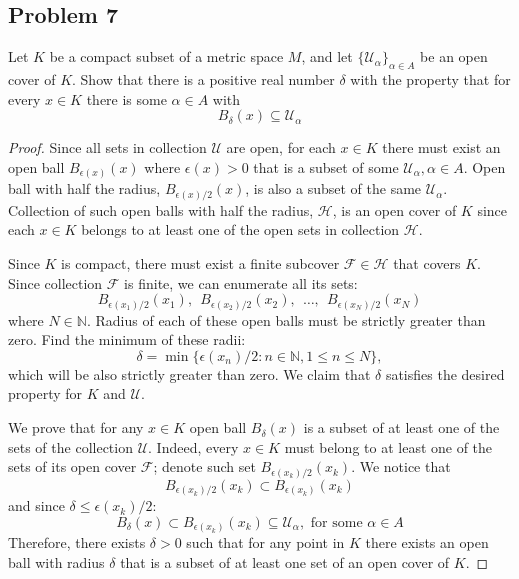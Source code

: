 \documentclass{article}
\begin{document}
\subsection*{Problem 7}

\begin{tcolorbox}
Let $K$ be a compact subset of a metric space $M$, and let $\{ \mathcal{U}_\alpha \}_{\alpha \in A}$ be an open cover of $K$. Show that there is a positive real number $\delta$ with the property that for every $x \in K$ there is some $\alpha \in A$ with
$$ B_\delta(x) \subseteq \mathcal{U}_\alpha $$
\end{tcolorbox}

\begin{proof}

Since all sets in collection $\mathcal{U}$ are open, for each $x \in K$ there must exist an open ball $B_{\epsilon(x)}(x)$ where $\epsilon(x) > 0$ that is a subset of some $\mathcal{U}_\alpha, \alpha \in A$. Open ball with half the radius, $B_{\epsilon(x) / 2}(x)$, is also a subset of the same $\mathcal{U}_\alpha$. Collection of such open balls with half the radius, $\mathcal{H}$, is an open cover of $K$ since each $x \in K$ belongs to at least one of the open sets in collection $\mathcal{H}$.

Since $K$ is compact, there must exist a finite subcover $\mathcal{F} \in \mathcal{H}$ that covers $K$. Since collection $\mathcal{F}$ is finite, we can enumerate all its sets:
$$ B_{\epsilon(x_1) / 2}(x_1), \>\> B_{\epsilon(x_2) / 2}(x_2), \>\> \dots, \>\> B_{\epsilon(x_N) / 2}(x_N) $$
where $N \in \mathbb{N}$. Radius of each of these open balls must be strictly greater than zero. Find the minimum of these radii:
$$ \delta = \min \{ \epsilon(x_n) / 2 : n \in \mathbb{N}, 1 \leq n \leq N \}, $$
which will be also strictly greater than zero. We claim that $\delta$ satisfies the desired property for $K$ and $\mathcal{U}$.

We prove that for any $x \in K$ open ball $B_\delta(x)$ is a subset of at least one of the sets of the collection $\mathcal{U}$. Indeed, every $x \in K$ must belong to at least one of the sets of its open cover $\mathcal{F}$; denote such set $B_{\epsilon(x_k)/2}(x_k)$. We notice that
$$ B_{\epsilon(x_k)/2}(x_k) \subset B_{\epsilon(x_k)}(x_k)$$
and since $\delta \leq \epsilon(x_k)/2$:
$$ B_\delta(x) \subset B_{\epsilon(x_k)}(x_k) \subseteq \mathcal{U}_\alpha, \text{ for some } \alpha \in A $$
Therefore, there exists $\delta > 0$ such that for any point in $K$ there exists an open ball with radius $\delta$ that is a subset of at least one set of an open cover of $K$.

\end{proof}
\end{document}
